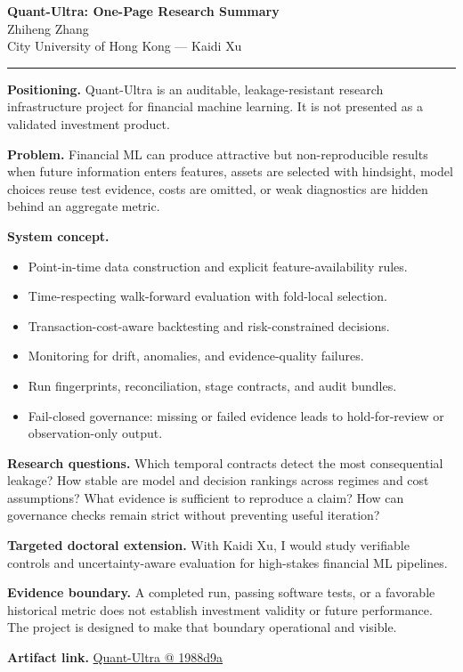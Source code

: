 \documentclass[11pt]{article}
\makeatletter
\newcommand{\ApplicantName}{Zhiheng Zhang}
\newcommand{\ApplicantGitHub}{\href{https://github.com/zhiheng-zhang-Mera/Quant-Ultra/tree/1988d9a8530da91a8158de864d098ea869098923}{Quant-Ultra @ 1988d9a}}
\makeatother
\begin{document}
\begin{center}
{\LARGE\bfseries Quant-Ultra: One-Page Research Summary}\\[0.25em]
{\large \ApplicantName}\\
City University of Hong Kong --- Kaidi Xu
\end{center}
\vspace{0.35em}\hrule\vspace{0.65em}

\textbf{Positioning.} Quant-Ultra is an auditable, leakage-resistant research infrastructure project for financial machine learning. It is not presented as a validated investment product.

\textbf{Problem.} Financial ML can produce attractive but non-reproducible results when future information enters features, assets are selected with hindsight, model choices reuse test evidence, costs are omitted, or weak diagnostics are hidden behind an aggregate metric.

\textbf{System concept.}
\begin{itemize}
\item Point-in-time data construction and explicit feature-availability rules.
\item Time-respecting walk-forward evaluation with fold-local selection.
\item Transaction-cost-aware backtesting and risk-constrained decisions.
\item Monitoring for drift, anomalies, and evidence-quality failures.
\item Run fingerprints, reconciliation, stage contracts, and audit bundles.
\item Fail-closed governance: missing or failed evidence leads to hold-for-review or observation-only output.
\end{itemize}

\textbf{Research questions.} Which temporal contracts detect the most consequential leakage? How stable are model and decision rankings across regimes and cost assumptions? What evidence is sufficient to reproduce a claim? How can governance checks remain strict without preventing useful iteration?

\textbf{Targeted doctoral extension.} With Kaidi Xu, I would study verifiable controls and uncertainty-aware evaluation for high-stakes financial ML pipelines.

\textbf{Evidence boundary.} A completed run, passing software tests, or a favorable historical metric does not establish investment validity or future performance. The project is designed to make that boundary operational and visible.

\textbf{Artifact link.} \ApplicantGitHub
\end{document}
